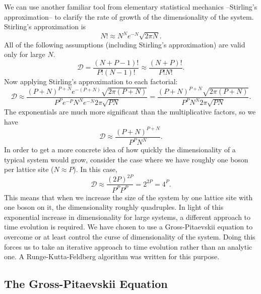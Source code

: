\documentclass[a4paper, 10pt]{article}
\theoremstyle{plain}
\begin{document}
We can use another familiar tool from elementary statistical mechanics 
--Stirling's approximation-- to clarify the rate of growth of the 
dimensionality of the system. Stirling's approximation \cite{Schroeder2007} is
\begin{equation}
    N! \approx N^{N} e^{-N} \sqrt{2 \pi N}.
\end{equation}
All of the following assumptions (including Stirling's approximation) are
valid only for large $N$.
\begin{equation*}
    \mathcal{D} = \frac{(N + P - 1)!}{P! (N-1)!}
    \approx
    \frac{(N + P)!}{P! N!}.
\end{equation*}
Now applying Stirling's approximation to each factorial:
\begin{equation*}
    \mathcal{D}
    \approx
    \frac{(P + N)^{P+N} e^{-(P + N)} \sqrt{2 \pi (P+N)}}
         {P^{P} e^{-P} N^{N} e^{-N} 2 \pi \sqrt{PN}}
    =
    \frac{(P + N)^{P+N} \sqrt{2 \pi (P+N)}}
         {P^{P} N^{N} 2\pi \sqrt{PN}}.
\end{equation*}
The exponentials are much more significant than the multiplicative factors, so
we have
\begin{equation*}
    \mathcal{D} \approx \frac{(P + N)^{P+N}}{P^P N^N}.
\end{equation*}
In order to get a more concrete idea of how quickly the dimensionality of a
typical system would grow, consider the case where we have roughly one boson
per lattice site ($N \approx P$). In this case,
\begin{equation*}
    \mathcal{D} \approx \frac{(2P)^{2P}}{P^{P} P^{P}} = 2^{2P} = 4^{P}.
\end{equation*}
This means that when we increase the size of the system by one lattice site with
one boson on it, the dimensionality roughly quadruples. In light of this
exponential increase in dimensionality for large systems, a different approach
to time evolution is required. We have chosen to use a Gross-Pitaevskii equation
to overcome or at least control the curse of dimensionality of the system. Doing
this forces us to take an iterative approach to time evolution rather than an
analytic one. A Runge-Kutta-Feldberg algorithm \cite{Burden2005} was written for
this purpose.


\subsection{The Gross-Pitaevskii Equation}
\end{document}
